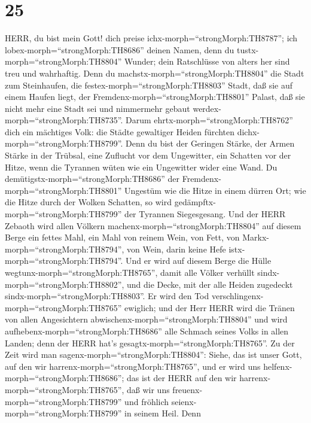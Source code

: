 \hypertarget{section-24}{%
\section{25}\label{section-24}}

 HERR, du bist mein Gott! dich preise
ichx-morph=``strongMorph:TH8787''; ich
lobex-morph=``strongMorph:TH8686'' deinen Namen, denn du
tustx-morph=``strongMorph:TH8804'' Wunder; dein Ratschlüsse von alters
her sind treu und wahrhaftig.  Denn du
machstx-morph=``strongMorph:TH8804'' die Stadt zum Steinhaufen, die
festex-morph=``strongMorph:TH8803'' Stadt, daß sie auf einem Haufen
liegt, der Fremdenx-morph=``strongMorph:TH8801'' Palast, daß sie nicht
mehr eine Stadt sei und nimmermehr gebaut
werdex-morph=``strongMorph:TH8735''.  Darum
ehrtx-morph=``strongMorph:TH8762'' dich ein mächtiges Volk: die Städte
gewaltiger Heiden fürchten dichx-morph=``strongMorph:TH8799''.
 Denn du bist der Geringen Stärke, der Armen Stärke in der
Trübsal, eine Zuflucht vor dem Ungewitter, ein Schatten vor der Hitze,
wenn die Tyrannen wüten wie ein Ungewitter wider eine Wand. 
Du demütigstx-morph=``strongMorph:TH8686'' der
Fremdenx-morph=``strongMorph:TH8801'' Ungestüm wie die Hitze in einem
dürren Ort; wie die Hitze durch der Wolken Schatten, so wird
gedämpftx-morph=``strongMorph:TH8799'' der Tyrannen Siegesgesang.
 Und der HERR Zebaoth wird allen Völkern
machenx-morph=``strongMorph:TH8804'' auf diesem Berge ein fettes Mahl,
ein Mahl von reinem Wein, von Fett, von
Markx-morph=``strongMorph:TH8794'', von Wein, darin keine Hefe
istx-morph=``strongMorph:TH8794''.  Und er wird auf diesem
Berge die Hülle wegtunx-morph=``strongMorph:TH8765'', damit alle Völker
verhüllt sindx-morph=``strongMorph:TH8802'', und die Decke, mit der alle
Heiden zugedeckt sindx-morph=``strongMorph:TH8803''.  Er
wird den Tod verschlingenx-morph=``strongMorph:TH8765'' ewiglich; und
der Herr HERR wird die Tränen von allen Angesichtern
abwischenx-morph=``strongMorph:TH8804'' und wird
aufhebenx-morph=``strongMorph:TH8686'' alle Schmach seines Volks in
allen Landen; denn der HERR hat's gesagtx-morph=``strongMorph:TH8765''.
 Zu der Zeit wird man sagenx-morph=``strongMorph:TH8804'':
Siehe, das ist unser Gott, auf den wir
harrenx-morph=``strongMorph:TH8765'', und er wird uns
helfenx-morph=``strongMorph:TH8686''; das ist der HERR auf den wir
harrenx-morph=``strongMorph:TH8765'', daß wir uns
freuenx-morph=``strongMorph:TH8799'' und fröhlich
seienx-morph=``strongMorph:TH8799'' in seinem Heil.  Denn
